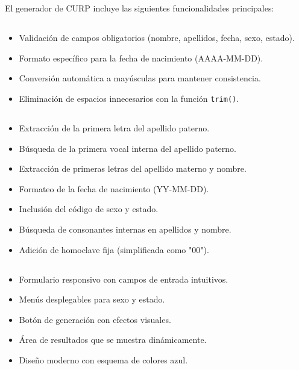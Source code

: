 \documentclass[10pt,a4paper]{article}
\begin{document}
\section{\color{colorIPN}{Funcionalidades Implementadas}}
El generador de CURP incluye las siguientes funcionalidades principales:

\subsection{\color{colorESCOM}{Validación de Datos}}
\begin{itemize}
	\item Validación de campos obligatorios (nombre, apellidos, fecha, sexo, estado).
	\item Formato específico para la fecha de nacimiento (AAAA-MM-DD).
	\item Conversión automática a mayúsculas para mantener consistencia.
	\item Eliminación de espacios innecesarios con la función \texttt{trim()}.
\end{itemize}

\subsection{\color{colorESCOM}{Algoritmo de Generación}}
\begin{itemize}
	\item Extracción de la primera letra del apellido paterno.
	\item Búsqueda de la primera vocal interna del apellido paterno.
	\item Extracción de primeras letras del apellido materno y nombre.
	\item Formateo de la fecha de nacimiento (YY-MM-DD).
	\item Inclusión del código de sexo y estado.
	\item Búsqueda de consonantes internas en apellidos y nombre.
	\item Adición de homoclave fija (simplificada como "00").
\end{itemize}

\subsection{\color{colorESCOM}{Interfaz Interactiva}}
\begin{itemize}
	\item Formulario responsivo con campos de entrada intuitivos.
	\item Menús desplegables para sexo y estado.
	\item Botón de generación con efectos visuales.
	\item Área de resultados que se muestra dinámicamente.
	\item Diseño moderno con esquema de colores azul.
\end{itemize}
\end{document}
